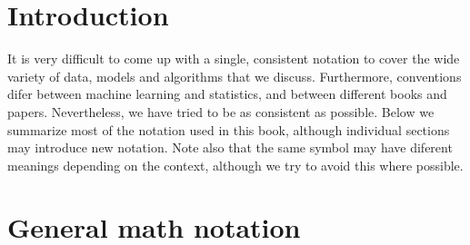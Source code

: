 \label{sec:Notation}

\section*{Introduction}
It is very difficult to come up with a single, consistent notation to cover the wide variety of
data, models and algorithms that we discuss. Furthermore, conventions difer between machine
learning and statistics, and between different books and papers. Nevertheless, we have tried
to be as consistent as possible. Below we summarize most of the notation used in this book,
although individual sections may introduce new notation. Note also that the same symbol may
have diferent meanings depending on the context, although we try to avoid this where possible.


\section*{General math notation}

